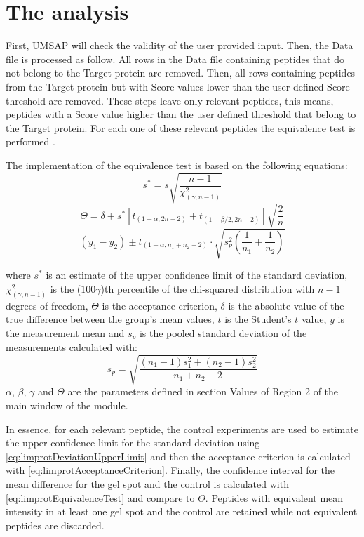 \section{The analysis}
\label{sec:limprotEquivalenceTest}
First, UMSAP will check the validity of the user provided input. Then, the Data file is processed as follow. All rows in the Data file containing peptides that do not belong to the Target protein are removed. Then, all rows containing peptides from the Target protein but with Score values lower than the user defined Score threshold are removed. These steps leave only relevant peptides, this means, peptides with a Score value higher than the user defined threshold that belong to the Target protein. For each one of these relevant peptides the equivalence test is performed \cite{Limentani2005}.

The implementation of the equivalence test is based on the following equations:
\begin{equation}
	\label{eq:limprotDeviationUpperLimit}
	s^* = s\sqrt{\frac{n-1}{\chi^2_{(\gamma, n-1)}}}
\end{equation}
\begin{equation}
\label{eq:limprotAcceptanceCriterion}
\Theta = \delta + s^*\left[t_{(1-\alpha, 2n-2)} + t_{(1-\beta/2, 2n-2)}\right]\sqrt{\frac{2}{n}}
\end{equation}
\begin{equation}
\label{eq:limprotEquivalenceTest}
(\bar{y}_1 - \bar{y}_2) \pm t_{(1-\alpha, n_1+n_2-2)} \cdot \sqrt{s^2_p\left(\frac{1}{n_1}+\frac{1}{n_2}\right)}
\end{equation}

where $s^*$ is an estimate of the upper confidence limit of the standard deviation, $\chi^2_{(\gamma, n-1)}$ is the ($100\gamma$)th percentile of the chi-squared distribution with $n-1$ degrees of freedom, $\Theta$ is the acceptance criterion, $\delta$ is the absolute value of the true difference between the group's mean values, $t$ is the Student's $t$ value, $\bar{y}$ is the measurement mean and $s_p$ is the pooled standard deviation of the measurements calculated with:
\begin{equation}
\label{eq:poolStDev}
s_p =  \sqrt{\frac{(n_1-1)s^2_1+(n_2-1)s^2_2}{n_1+n_2-2}}
\end{equation}
$\alpha$, $\beta$, $\gamma$ and $\Theta$ are the parameters defined in section Values of Region \num{2} of the main window of the module.

In essence, for each relevant peptide, the control experiments are used to estimate the upper confidence limit for the standard deviation using \autoref{eq:limprotDeviationUpperLimit} and then the acceptance criterion is calculated with \autoref{eq:limprotAcceptanceCriterion}. Finally, the confidence interval for the mean difference for the gel spot and the control is calculated with \autoref{eq:limprotEquivalenceTest} and compare to $\Theta$. Peptides with equivalent mean intensity in at least one gel spot and the control are retained while not equivalent peptides are discarded. 

